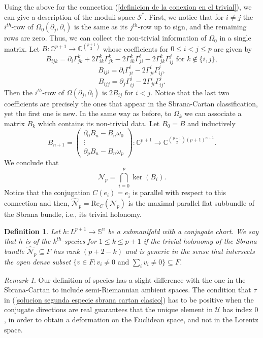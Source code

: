 \documentclass{article}
\newtheorem{defn}[thm]{Definition}
\theoremstyle{remark}
\newtheorem{remark}[thm]{Remark}
\begin{document}
Using the above for the connection (\ref{definicion de la conexion en el trivial}), we can give a description of the moduli space $\mathcal{S}^{*}$. First, we notice that for $i\neq j$ the $i^{th}$-row of $\Omega_0(\partial_j,\partial_i)$ is the same as its $j^{th}$-row up to sign, and the remaining rows are zero. Thus, we can collect the non-trivial information of $\Omega_0$ in a single matrix. Let  $B:\mathbb{C}^{p+1}\rightarrow\mathbb{C}^{\binom{p+1}{2}}$ whose coefficients for $0\leq i<j\leq p$ are given by
$$B_{ijk}=\partial_i\Gamma^k_{jk}+2\Gamma^k_{ik}\Gamma^k_{jk}-2\Gamma^k_{ik}\Gamma^i_{ji}-2\Gamma^k_{jk}\Gamma^j_{ij} \text{ for }k\notin\{i,j\},$$
$$B_{iji}=\partial_i\Gamma^i_{ji}-2\Gamma^i_{ji}\Gamma^j_{ij},$$
$$B_{ijj}=\partial_j\Gamma^j_{ij}-2\Gamma^i_{ji}\Gamma^j_{ij}.$$
Then the $i^{th}$-row of $\Omega(\partial_j,\partial_i)$ is $2B_{ij}$ for $i<j$. Notice that the last two coefficients are precisely the ones that appear in the Sbrana-Cartan classification, yet the first one is new. In the same way as before, to $\Omega_k$ we can associate a matrix $B_k$ which contains its non-trivial data. Let $B_0=B$ and inductively
\begin{equation*}\label{definicion inductiva de B_n}
    B_{n+1}=\begin{pmatrix}
        \partial_0B_n-B_n\omega_0\\
        \vdots\\
        \partial_pB_n-B_n\omega_p
        \end{pmatrix}:\mathbb{C}^{p+1}\rightarrow\mathbb{C}^{\binom{p+1}{2}(p+1)^{n+1}}.
\end{equation*}
We conclude that
$$\mathcal{N}_p=\bigcap_{i=0}^p\ker(B_i).$$
Notice that the conjugation $C(e_i)=e_{\overline{i}}$ is parallel with respect to this connection and then, $\hat{\mathcal{N}}_{p}=\text{Re}_C(\mathcal{N}_{p})$ is the maximal parallel flat subbundle of the Sbrana bundle, i.e., its trivial holonomy.
\begin{defn}
    \normalfont Let $h:L^{p+1}\rightarrow\mathbb{S}^{n}$ be a submanifold with a conjugate chart.
    We say that $h$ is of the $k^{th}$-{\it species} for $1\leq k\leq p+1$ if the trivial holonomy of the Sbrana bundle $\hat{\mathcal{N}}_p\subseteq F$ has rank $(p+2-k)$ and is generic in the sense that intersects the open dense subset $\{v\in F: v_i\neq 0\text{ and }\sum_iv_i\neq 0\}\subseteq F$.
\end{defn}
\begin{remark}
    Our definition of species has a slight difference with the one in the Sbrana-Cartan to include semi-Riemannian ambient spaces. 
    The condition that $\tau$ in (\ref{solucion segunda especie sbrana cartan clasico}) has to be positive when the conjugate directions are real guarantees that the unique element in $\mathcal{U}$ has index $0$, in order to obtain a deformation on the Euclidean space, and not in the Lorentz space.
\end{remark}
\end{document}
